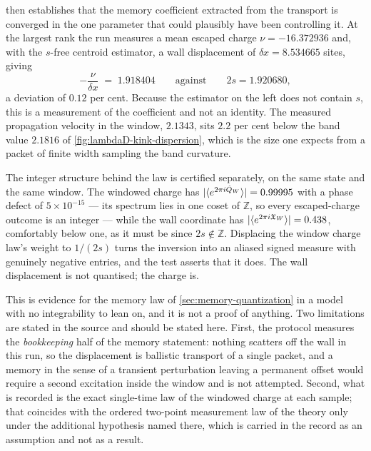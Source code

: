  then establishes that the memory
coefficient extracted from the transport is converged in the one parameter
that could plausibly have been controlling it. At the largest rank the run
measures a mean escaped charge $\nu=-16.372936$ and, with the $s$-free
centroid estimator, a wall displacement of $\delta x = 8.534665$ sites, giving
\begin{equation}
  -\frac{\nu}{\delta x} \;=\; 1.918404
  \qquad\text{against}\qquad 2s = 1.920680 ,
  \label{eq:num-coefficient}
\end{equation}
a deviation of $0.12$ per cent. Because the estimator on the left does not
contain $s$, this is a measurement of the coefficient and not an identity. The
measured propagation velocity in the window, $2.1343$, sits $2.2$ per cent
below the band value $2.1816$ of \cref{fig:lambdaD-kink-dispersion}, which is
the size one expects from a packet of finite width sampling the band
curvature.

The integer structure behind the law is certified separately, on the same
state and the same window. The windowed charge has
$|\langle e^{2\pi i\hat{Q}_W}\rangle| = 0.99995$ with a phase defect of
$5\times10^{-15}$ --- its spectrum lies in one coset of $\mathbb{Z}$, so every
escaped-charge outcome is an integer --- while the wall coordinate has
$|\langle e^{2\pi i\mathfrak{X}_W}\rangle| = 0.438$, comfortably below one, as
it must be since $2s\notin\mathbb{Z}$. Displacing the window charge law's
weight to $1/(2s)$ turns the inversion into an aliased signed measure with
genuinely negative entries, and the test asserts that it does. The wall
displacement is not quantised; the charge is.

This is evidence for the memory law of \cref{sec:memory-quantization} in a
model with no integrability to lean on, and it is not a proof of anything. Two
limitations are stated in the source and should be stated here. First, the
protocol measures the \emph{bookkeeping} half of the memory statement: nothing
scatters off the wall in this run, so the displacement is ballistic transport
of a single packet, and a memory in the sense of a transient perturbation
leaving a permanent offset would require a second excitation inside the window
and is not attempted. Second, what is recorded is the exact single-time law of
the windowed charge at each sample; that coincides with the ordered two-point
measurement law of the theory only under the additional hypothesis named
there, which is carried in the record as an assumption and not as a result.

